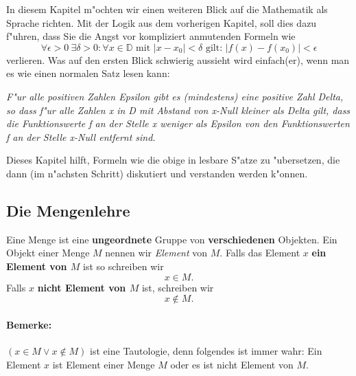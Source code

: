 In diesem Kapitel m"ochten wir einen weiteren Blick auf die Mathematik als Sprache richten. Mit der Logik aus dem vorherigen Kapitel, soll dies dazu f"uhren, dass Sie die Angst vor kompliziert anmutenden Formeln wie
\begin{equation*}
\forall \epsilon > 0 \ \exists \delta > 0 : \forall x \in \mathbb{D} \text{ mit } \left|x - x_0 \right| < \delta \text{ gilt: } \left| f(x) - f(x_0) \right| < \epsilon 
\end{equation*}
verlieren. Was auf den ersten Blick schwierig aussieht wird einfach(er), wenn man es wie einen normalen Satz lesen kann:

\textit{
F"ur alle positiven Zahlen Epsilon gibt es (mindestens) eine positive Zahl Delta, so dass f"ur alle Zahlen x in D mit Abstand von x-Null kleiner als Delta gilt, dass die Funktionswerte f an der Stelle x weniger als Epsilon von den Funktionswerten f an der Stelle x-Null entfernt sind.
}

Dieses Kapitel hilft, Formeln wie die obige in lesbare S"atze zu "ubersetzen, die dann (im n"achsten Schritt) diskutiert und verstanden werden k"onnen.

\subsection{Die Mengenlehre}
Eine Menge ist eine \textbf{ungeordnete} Gruppe von \textbf{verschiedenen} Objekten. Ein Objekt einer Menge $M$ nennen wir \textit{Element} von $M$. Falls das Element $x$ \textbf{ein Element von $M$} ist so schreiben wir 
\begin{equation*}
x \in M.
\end{equation*}
Falls $x$ \textbf{nicht Element von $M$} ist, schreiben wir
\begin{equation*}
x \notin M.
\end{equation*}

\paragraph{Bemerke:} $(x \in M \lor x \notin M)$ ist eine Tautologie, denn folgendes ist immer wahr: Ein Element $x$ ist Element einer Menge $M$ oder es ist nicht Element von $M$.

